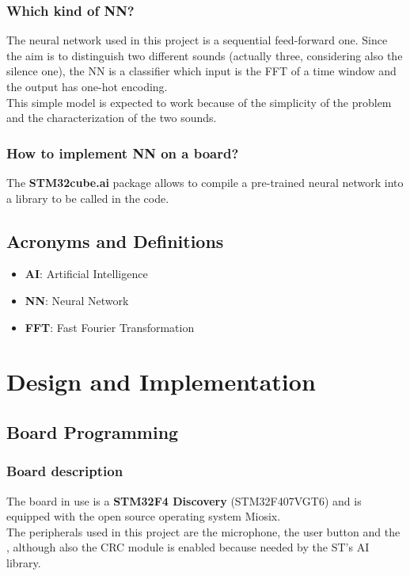 \documentclass[12pt]{article}
\begin{document}
\subsubsection{Which kind of NN?}
The neural network used in this project is a sequential feed-forward one. Since the aim is to distinguish two different sounds (actually three, considering also the silence one), the NN is a classifier which input is the FFT of a time window and the output has one-hot encoding.\\
This simple model is expected to work because of the simplicity of the problem and the characterization of the two sounds.

\subsubsection{How to implement NN on a board?}
The \textbf{STM32cube.ai} package allows to compile a pre-trained neural network into a library to be called in the code.

\subsection{Acronyms and Definitions}
\begin{itemize}
 \item \textbf{AI}: Artificial Intelligence
 \item \textbf{NN}: Neural Network
 \item \textbf{FFT}: Fast Fourier Transformation
\end{itemize}


\section{Design and Implementation}
\subsection{Board Programming}
\subsubsection{Board description}
The board in use is a \textbf{STM32F4 Discovery} (STM32F407VGT6) and is equipped with the open source operating system Miosix.\\
The peripherals used in this project are the microphone, the user button and the , although also the CRC module is enabled because needed by the ST's AI library.
\end{document}
